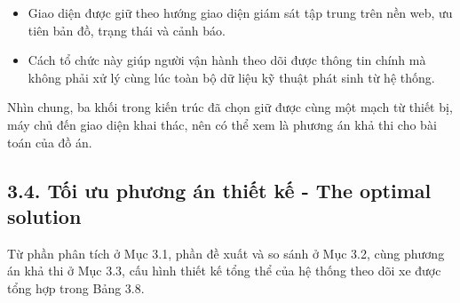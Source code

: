 \documentclass[a4paper]{extarticle}
\providecommand{\tightlist}{%
  \setlength{\itemsep}{0pt}\setlength{\parskip}{0pt}}
\begin{document}
\begin{itemize}
  \begin{itemize}
  \tightlist
  \item
    Giao diện được giữ theo hướng giao diện giám sát tập trung trên nền web, ưu tiên bản đồ, trạng thái và cảnh báo.
  \item
    Cách tổ chức này giúp người vận hành theo dõi được thông tin chính mà không phải xử lý cùng lúc toàn bộ dữ liệu kỹ thuật phát sinh từ hệ thống.
  \end{itemize}
\end{itemize}

Nhìn chung, ba khối trong kiến trúc đã chọn giữ được cùng một mạch từ thiết bị, máy chủ đến giao diện khai thác, nên có thể xem là phương án khả thi cho bài toán của đồ án.

\subsection{3.4. Tối ưu phương án thiết kế - The optimal solution}\label{tux1ed1i-ux1b0u-phux1b0ux1a1ng-uxe1n-thiux1ebft-kux1ebf---the-optimal-solution}

Từ phần phân tích ở Mục 3.1, phần đề xuất và so sánh ở Mục 3.2, cùng phương án khả thi ở Mục 3.3, cấu hình thiết kế tổng thể của hệ thống theo dõi xe được tổng hợp trong Bảng 3.8.
\end{document}
